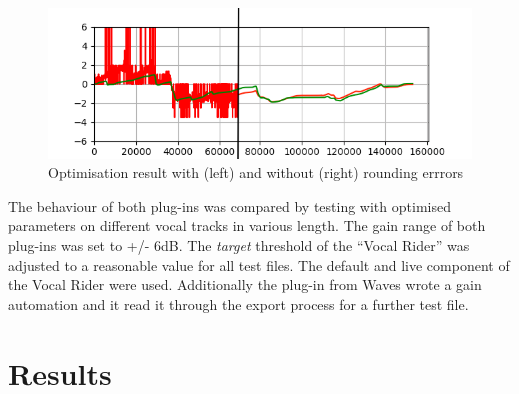 \begin{figure}[H]
\includegraphics[width=\textwidth]{images/afterSmooth}
\caption{Optimisation result with (left) and without (right) rounding errrors}
\end{figure}

The behaviour of both plug-ins was compared by testing with optimised parameters on different vocal tracks in various length. The gain range of both plug-ins was set to +/- 6dB. The \textit{target} threshold of the “Vocal Rider” was adjusted to a reasonable value for all test files. The default and live component of the Vocal Rider were used. Additionally the plug-in from Waves wrote a gain automation and it read it through the export process for a further test file.\\

\section{Results}

